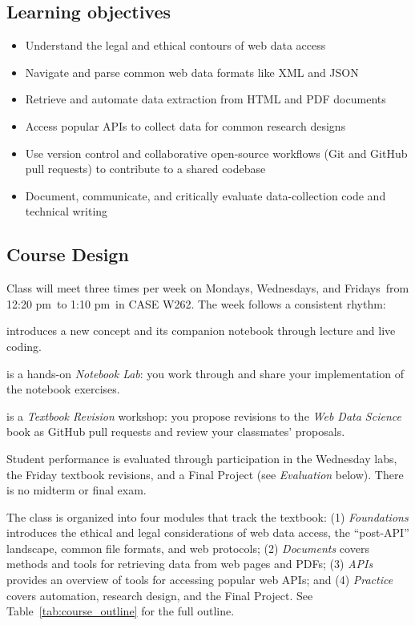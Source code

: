 \documentclass[11pt]{memoir}
\def\classroom{CASE W262}
\def\meetingdays{Mondays, Wednesdays, and Fridays}
\def\starttime{12:20 pm}
\def\endtime{1:10 pm}
\begin{document}
\subsection{Learning objectives}

\begin{itemize}[itemsep=0em]
    \item Understand the legal and ethical contours of web data access
    \item Navigate and parse common web data formats like XML and JSON
    \item Retrieve and automate data extraction from HTML and PDF documents
    \item Access popular APIs to collect data for common research designs
    \item Use version control and collaborative open-source workflows (Git and GitHub pull requests) to contribute to a shared codebase
    \item Document, communicate, and critically evaluate data-collection code and technical writing
\end{itemize}

\subsection{Course Design}
Class will meet three times per week on \meetingdays~from \starttime~to \endtime~in \classroom. The week follows a consistent rhythm:
\begin{description}[itemsep=2pt,labelsep=0.5em,leftmargin=1.5em]
    \item[Monday] introduces a new concept and its companion notebook through lecture and live coding.
    \item[Wednesday] is a hands-on \textit{Notebook Lab}: you work through and share your implementation of the notebook exercises.
    \item[Friday] is a \textit{Textbook Revision} workshop: you propose revisions to the \textit{Web Data Science} book as GitHub pull requests and review your classmates' proposals.
\end{description}
Student performance is evaluated through participation in the Wednesday labs, the Friday textbook revisions, and a Final Project (see \textit{Evaluation} below). There is no midterm or final exam.

The class is organized into four modules that track the textbook: (1) \textit{Foundations} introduces the ethical and legal considerations of web data access, the ``post-API'' landscape, common file formats, and web protocols; (2) \textit{Documents} covers methods and tools for retrieving data from web pages and PDFs; (3) \textit{APIs} provides an overview of tools for accessing popular web APIs; and (4) \textit{Practice} covers automation, research design, and the Final Project. See Table~\ref{tab:course_outline} for the full outline.
\end{document}
